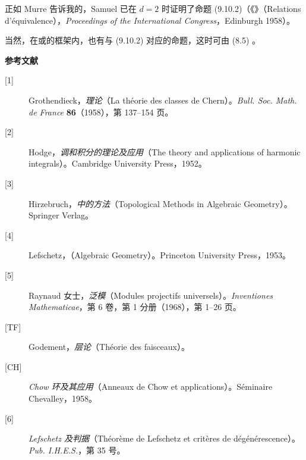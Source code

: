 正如 Murre 告诉我的，Samuel 已在 $d=2$ 时证明了命题 (9.10.2)（《》（Relations d'équivalence），\emph{Proceedings of the International Congress}，Edinburgh 1958）。

当然，在或的框架内，也有与 (9.10.2) 对应的命题，这时可由 (8.5) 。

\textbf{参考文献}
\begin{description}
\item[{[1]}] Grothendieck，\emph{理论}（La théorie des classes de Chern）。\emph{Bull. Soc. Math. de France} \textbf{86}（1958），第 137--154 页。
\item[{[2]}] Hodge，\emph{调和积分的理论及应用}（The theory and applications of harmonic integrals）。Cambridge University Press，1952。
\item[{[3]}] Hirzebruch，\emph{中的方法}（Topological Methods in Algebraic Geometry）。Springer Verlag。
\item[{[4]}] Lefschetz，\emph{}（Algebraic Geometry）。Princeton University Press，1953。
\item[{[5]}] Raynaud 女士，\emph{泛模}（Modules projectifs universels）。\emph{Inventiones Mathematicae}，第 6 卷，第 1 分册（1968），第 1--26 页。
\item[{[TF]}] Godement，\emph{层论}（Théorie des faisceaux）。
\item[{[CH]}] \emph{Chow 环及其应用}（Anneaux de Chow et applications）。Séminaire Chevalley，1958。
\item[{[6]}] \emph{Lefschetz 及判据}（Théorème de Lefschetz et critères de dégénérescence）。\emph{Pub. I.H.E.S.}，第 35 号。
\end{description}

